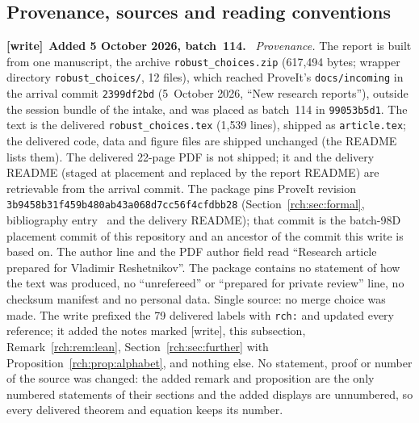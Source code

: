 \documentclass[11pt]{article}
\theoremstyle{definition}
\theoremstyle{remark}
\newcommand{\file}[1]{\nolinkurl{#1}}
\newenvironment{writenote}[1][]{\par\smallskip\begingroup\small
 \noindent\textbf{[write]}\if\relax\detokenize{#1}\relax\else~\textbf{#1.}\fi\ }%
 {\par\endgroup\smallskip}
\begin{document}
\subsection{Provenance, sources and reading conventions}
\label{rch:sec:provenance}
\begin{writenote}[Added 5 October 2026, batch~114]
\emph{Provenance.} The report is built from one manuscript, the archive
\file{robust_choices.zip} (617{,}494 bytes; wrapper directory
\file{robust_choices/}, 12 files), which reached ProveIt's
\file{docs/incoming} in the arrival commit \file{2399df2bd} (5~October 2026,
``New research reports''), outside the session bundle of the intake, and
was placed as batch~114 in \file{99053b5d1}. The text is the delivered
\file{robust_choices.tex} (1{,}539 lines), shipped as \file{article.tex};
the delivered code, data and figure files are shipped unchanged (the README
lists them). The delivered 22-page PDF is not shipped; it and the delivery
README (staged at placement and replaced by the report README) are
retrievable from the arrival commit. The package pins ProveIt revision
\file{3b9458b31f459b480ab43a068d7cc56f4cfdbb28}
(Section~\ref{rch:sec:formal}, bibliography entry~\cite{ProveIt} and the
delivery README); that commit is the batch-98D placement commit of this
repository and an ancestor of the commit this write is based on. The author
line and the PDF author field read ``Research article prepared for Vladimir
Reshetnikov''. The package contains no statement of how the text was
produced, no ``unrefereed'' or ``prepared for private review'' line, no
checksum manifest and no personal data. Single source: no merge choice was
made. The write prefixed the 79 delivered labels with \file{rch:} and
updated every reference; it added the notes marked [write], this
subsection, Remark~\ref{rch:rem:lean}, Section~\ref{rch:sec:further} with
Proposition~\ref{rch:prop:alphabet}, and nothing else. No statement, proof
or number of the source was changed: the added remark and proposition are
the only numbered statements of their sections and the added displays are
unnumbered, so every delivered theorem and equation keeps its number.


\end{writenote}
\end{document}
